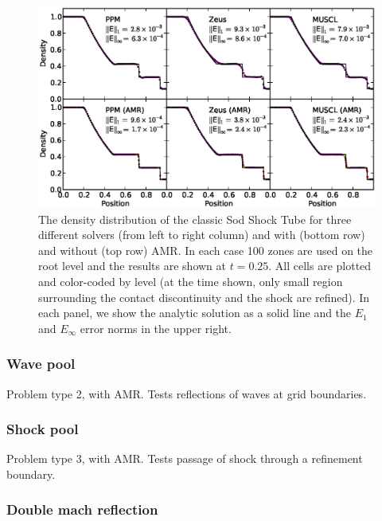 \begin{figure}
\begin{center}
\includegraphics[width=\textwidth]{figures/SodShockTube.eps}
\caption{The density distribution of the classic Sod Shock Tube for
three different solvers (from left to right column) and with (bottom
row) and without (top row) AMR.  In each case 100 zones are used on
the root level and the results are shown at $t=0.25$.  All cells are
plotted and color-coded by level (at the time shown, only small region
surrounding the contact discontinuity and the shock are refined).  In
each panel, we show the analytic solution as a solid line and the $E_1$
and $E_\infty$ error norms in the upper right.}
\label{fig.sodshocktube}
\end{center}
\end{figure}


\subsubsection{Wave pool}
\label{sec.tests.wavepool}
Problem type 2, with AMR.  Tests reflections of waves at grid boundaries.

\subsubsection{Shock pool}
\label{sec.tests.shockpool}
Problem type 3, with AMR.  Tests passage of shock through a refinement boundary.

\subsubsection{Double mach reflection}
\label{sec.tests.doublemach}

